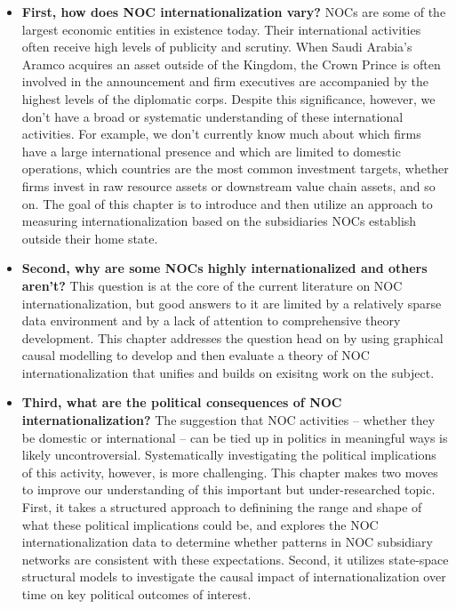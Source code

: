 \documentclass[11pt,]{book}
\providecommand{\tightlist}{%
  \setlength{\itemsep}{0pt}\setlength{\parskip}{0pt}}
\begin{document}
\begin{itemize}
\tightlist
\item
  \textbf{First, how does NOC internationalization vary?} NOCs are some of the largest economic entities in existence today. Their international activities often receive high levels of publicity and scrutiny. When Saudi Arabia's Aramco acquires an asset outside of the Kingdom, the Crown Prince is often involved in the announcement and firm executives are accompanied by the highest levels of the diplomatic corps. Despite this significance, however, we don't have a broad or systematic understanding of these international activities. For example, we don't currently know much about which firms have a large international presence and which are limited to domestic operations, which countries are the most common investment targets, whether firms invest in raw resource assets or downstream value chain assets, and so on. The goal of this chapter is to introduce and then utilize an approach to measuring internationalization based on the subsidiaries NOCs establish outside their home state.
\item
  \textbf{Second, why are some NOCs highly internationalized and others aren't?} This question is at the core of the current literature on NOC internationalization, but good answers to it are limited by a relatively sparse data environment and by a lack of attention to comprehensive theory development. This chapter addresses the question head on by using graphical causal modelling to develop and then evaluate a theory of NOC internationalization that unifies and builds on exisitng work on the subject.
\item
  \textbf{Third, what are the political consequences of NOC internationalization?} The suggestion that NOC activities -- whether they be domestic or international -- can be tied up in politics in meaningful ways is likely uncontroversial. Systematically investigating the political implications of this activity, however, is more challenging. This chapter makes two moves to improve our understanding of this important but under-researched topic. First, it takes a structured approach to definining the range and shape of what these political implications could be, and explores the NOC internationalization data to determine whether patterns in NOC subsidiary networks are consistent with these expectations. Second, it utilizes state-space structural models to investigate the causal impact of internationalization over time on key political outcomes of interest.
\end{itemize}
\end{document}
